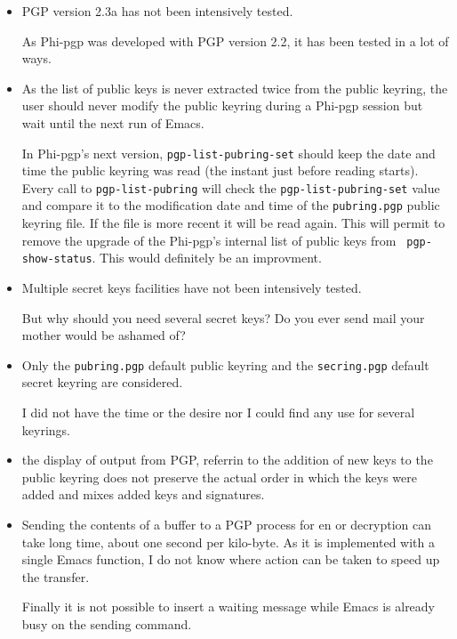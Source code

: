 \begin{itemize}
 \item  PGP version 2.3a has not been intensively tested. 

As Phi-pgp was  developed with PGP version 2.2,  it has been tested
in a lot of ways.

 \item  As the list of   public keys is  never  extracted twice from  the
public keyring, the user should never modify the public keyring during a
Phi-pgp session but wait until the next run of Emacs.

\begin{sloppypar}
In Phi-pgp's next  version, {\tt pgp-list-pubring-set} should keep the
date and time the  public keyring was   read (the instant just  before
reading  starts). Every call to {\tt  pgp-list-pubring} will check the
{\tt pgp-list-pubring-set} value  and compare  it to the  modification
date  and time  of the {\tt  pubring.pgp}  public keyring file. If the
file is more recent it will be read  again. This will permit to remove
the upgrade  of the Phi-pgp's internal list  of  public keys from {\tt
pgp-show-status}.  This would definitely be an improvment.
\end{sloppypar}

 \item   Multiple  secret keys  facilities  have  not been intensively
tested.

But  why should you need several  secret keys? Do  you  ever send mail
your mother would be ashamed of?

 \item  Only the {\tt pubring.pgp} default   public   keyring and   the
{\tt secring.pgp} default secret keyring are considered.

I did not  have the time or  the desire nor  I could find any  use for
several keyrings.

 \item the display of output from PGP, referrin to the addition of new
keys to the public keyring does not preserve the actual order in which
the keys were added and mixes added keys and signatures.

 \item Sending  the contents of a buffer  to a PGP  process  for en or
decryption can take long time,  about one second  per kilo-byte. As it
is   implemented with a  single Emacs  function, I  do  not know where
action can be taken to speed up the transfer.

Finally it is not possible to insert  a waiting message while Emacs is
already busy on the sending command.
\end{itemize}

